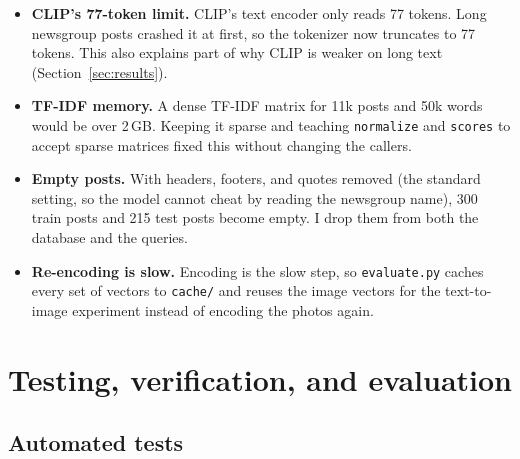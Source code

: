 \documentclass{article}
\begin{document}
\begin{itemize}
  \item \textbf{CLIP's 77-token limit.} CLIP's text encoder only reads 77 tokens. Long newsgroup posts crashed it at first, so the tokenizer now truncates to 77 tokens. This also explains part of why CLIP is weaker on long text (Section~\ref{sec:results}).
  \item \textbf{TF-IDF memory.} A dense TF-IDF matrix for 11k posts and 50k words would be over 2\,GB. Keeping it sparse and teaching \texttt{normalize} and \texttt{scores} to accept sparse matrices fixed this without changing the callers.
  \item \textbf{Empty posts.} With headers, footers, and quotes removed (the standard setting, so the model cannot cheat by reading the newsgroup name), 300 train posts and 215 test posts become empty. I drop them from both the database and the queries.
  \item \textbf{Re-encoding is slow.} Encoding is the slow step, so \texttt{evaluate.\allowbreak py} caches every set of vectors to \texttt{cache/} and reuses the image vectors for the text-to-image experiment instead of encoding the photos again.
\end{itemize}

\section{Testing, verification, and evaluation}
\label{sec:testing}

\subsection{Automated tests}
\end{document}
